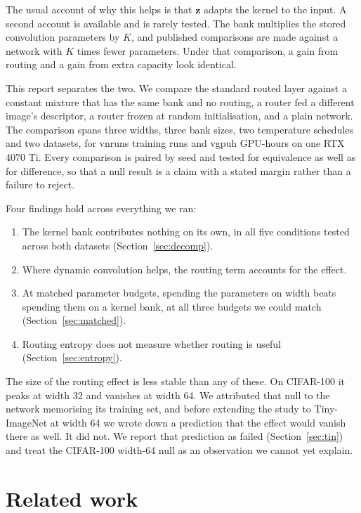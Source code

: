 \documentclass[10pt,a4paper]{article}
\newcommand{\zv}{\mathbf{z}}
\newcommand{\V}[1]{\csname v#1\endcsname}
\begin{document}
The usual account of why this helps is that $\zv$ adapts the kernel to
the input. A second account is available and is rarely tested. The bank
multiplies the stored convolution parameters by $K$, and published
comparisons are made against a network with $K$ times fewer parameters.
Under that comparison, a gain from routing and a gain from extra
capacity look identical.

This report separates the two. We compare the standard routed layer
against a constant mixture that has the same bank and no routing, a
router fed a different image's descriptor, a router frozen at random
initialisation, and a plain network. The comparison spans three widths,
three bank sizes, two temperature schedules and two datasets, for
\V{nruns} training runs and \V{gpuh} GPU-hours on one RTX 4070 Ti. Every
comparison is paired by seed and tested for equivalence as well as for
difference, so that a null result is a claim with a stated margin
rather than a failure to reject.

Four findings hold across everything we ran:
\begin{enumerate}\setlength\itemsep{1pt}
\item The kernel bank contributes nothing on its own, in all five
conditions tested across both datasets (Section~\ref{sec:decomp}).
\item Where dynamic convolution helps, the routing term accounts for the
effect.
\item At matched parameter budgets, spending the parameters on width
beats spending them on a kernel bank, at all three budgets we could
match (Section~\ref{sec:matched}).
\item Routing entropy does not measure whether routing is useful
(Section~\ref{sec:entropy}).
\end{enumerate}

The size of the routing effect is less stable than any of these. On
CIFAR-100 it peaks at width 32 and vanishes at width 64. We attributed
that null to the network memorising its training set, and before
extending the study to Tiny-ImageNet at width 64 we wrote down a
prediction that the effect would vanish there as well. It did not. We
report that prediction as failed (Section~\ref{sec:tin}) and treat the
CIFAR-100 width-64 null as an observation we cannot yet explain.

\section{Related work}
\end{document}
